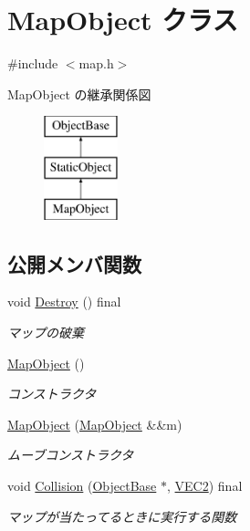 \hypertarget{class_map_object}{}\section{Map\+Object クラス}
\label{class_map_object}


{\ttfamily \#include $<$map.\+h$>$}

Map\+Object の継承関係図\begin{figure}[H]
\begin{center}
\leavevmode
\includegraphics[height=3.000000cm]{class_map_object}
\end{center}
\end{figure}
\subsection*{公開メンバ関数}
\begin{DoxyCompactItemize}
\item 
void \mbox{\hyperlink{class_map_object_ad4bcfdc33bd945a9aa5e50a57c2704bc}{Destroy}} () final
\begin{DoxyCompactList}\small\item\em マップの破棄 \end{DoxyCompactList}\item 
\mbox{\hyperlink{class_map_object_a568754515cc72ce0861d30c3040d26d2}{Map\+Object}} ()
\begin{DoxyCompactList}\small\item\em コンストラクタ \end{DoxyCompactList}\item 
\mbox{\hyperlink{class_map_object_aae3a8a07e453e38a58b01e2eea16a76a}{Map\+Object}} (\mbox{\hyperlink{class_map_object}{Map\+Object}} \&\&m)
\begin{DoxyCompactList}\small\item\em ムーブコンストラクタ \end{DoxyCompactList}\item 
void \mbox{\hyperlink{class_map_object_a61c2b7e046b76d98adbf23c9e6302918}{Collision}} (\mbox{\hyperlink{class_object_base}{Object\+Base}} $\ast$, \mbox{\hyperlink{transform_8h_afb0c5e21d4133ff4f200992c0b534e1b}{V\+E\+C2}}) final
\begin{DoxyCompactList}\small\item\em マップが当たってるときに実行する関数 \end{DoxyCompactList}\end{DoxyCompactItemize}
